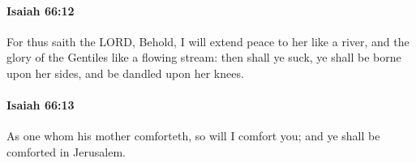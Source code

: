 		\paragraph{Isaiah 66:12} %
			\label{ISAIAH-66-12}

			For thus saith the LORD, Behold, I will extend peace to her like a river, and the glory of the Gentiles like a flowing stream: then shall ye suck, ye shall be borne upon her sides, and be dandled upon her knees.


		\paragraph{Isaiah 66:13} %
			\label{ISAIAH-66-13}

			As one whom his mother comforteth, so will I comfort you; and ye shall be comforted in Jerusalem.


